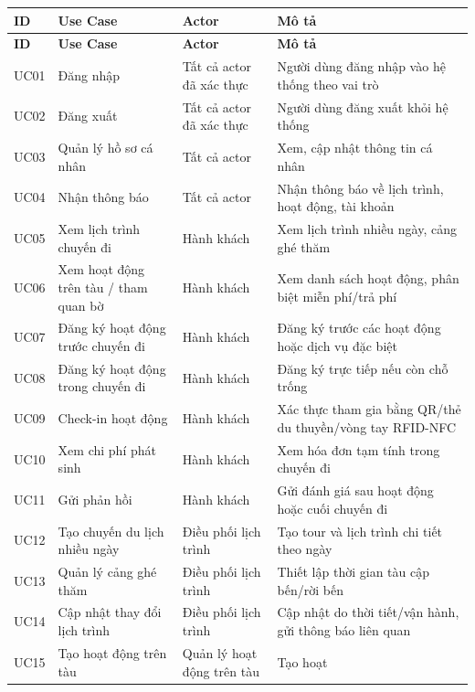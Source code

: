 \begin{longtable}{|p{1.2cm}|p{4.0cm}|p{3.5cm}|p{9.3cm}|}
    \hline
    \textbf{ID} & \textbf{Use Case} & \textbf{Actor} & \textbf{Mô tả} \\
    \hline
    \endfirsthead
    \hline
    \textbf{ID} & \textbf{Use Case} & \textbf{Actor} & \textbf{Mô tả} \\
    \hline
    \endhead
    UC01 & Đăng nhập & Tất cả actor đã xác thực & Người dùng đăng nhập vào
    hệ thống theo vai trò \\
    \hline
    UC02 & Đăng xuất & Tất cả actor đã xác thực & Người dùng đăng xuất khỏi
    hệ thống \\
    \hline
    UC03 & Quản lý hồ sơ cá nhân & Tất cả actor & Xem, cập nhật thông tin
    cá nhân \\
    \hline
    UC04 & Nhận thông báo & Tất cả actor & Nhận thông báo về lịch trình,
    hoạt động, tài khoản \\
    \hline
    UC05 & Xem lịch trình chuyến đi & Hành khách & Xem lịch trình nhiều
    ngày, cảng ghé thăm \\
    \hline
    UC06 & Xem hoạt động trên tàu / tham quan bờ & Hành khách & Xem danh
    sách hoạt động, phân biệt miễn phí/trả phí \\
    \hline
    UC07 & Đăng ký hoạt động trước chuyến đi & Hành khách & Đăng ký trước
    các hoạt động hoặc dịch vụ đặc biệt \\
    \hline
    UC08 & Đăng ký hoạt động trong chuyến đi & Hành khách & Đăng ký trực
    tiếp nếu còn chỗ trống \\
    \hline
    UC09 & Check-in hoạt động & Hành khách & Xác thực tham gia bằng QR/thẻ
    du thuyền/vòng tay RFID-NFC \\
    \hline
    UC10 & Xem chi phí phát sinh & Hành khách & Xem hóa đơn tạm tính trong
    chuyến đi \\
    \hline
    UC11 & Gửi phản hồi & Hành khách & Gửi đánh giá sau hoạt động hoặc cuối
    chuyến đi \\
    \hline
    UC12 & Tạo chuyến du lịch nhiều ngày & Điều phối lịch trình & Tạo tour
    và lịch trình chi tiết theo ngày \\
    \hline
    UC13 & Quản lý cảng ghé thăm & Điều phối lịch trình & Thiết lập thời
    gian tàu cập bến/rời bến \\
    \hline
    UC14 & Cập nhật thay đổi lịch trình & Điều phối lịch trình & Cập nhật
    do thời tiết/vận hành, gửi thông báo liên quan \\
    \hline
    UC15 & Tạo hoạt động trên tàu & Quản lý hoạt động trên tàu & Tạo hoạt

\end{longtable}
